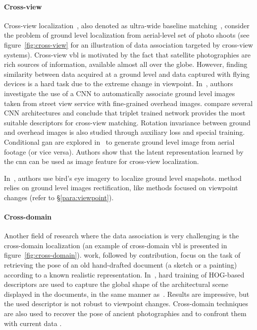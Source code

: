 		\paragraph{Cross-view}
			\label{para:cross_view}
			Cross-view localization~\citep{Lin2013,Workman2015,Castaldo2015,Vo2016,Tian2017}, also denoted as ultra-wide baseline matching~\citep{Bansal2012}, consider the problem of ground level localization from aerial-level set of photo shoots (see figure~\ref{fig:cross-view} for an illustration of data association targeted by cross-view systems). Cross-view \ac{vbl} is motivated by the fact that satellite photographies are rich sources of information, available almost all over the globe. However, finding similarity between data acquired at a ground level and data captured with flying devices is a hard task due to the extreme change in viewpoint. In~\citep{Workman2015,Vo2016}, authors investigate the use of a CNN to automatically associate ground level images taken from street view service with fine-grained overhead images. \citet{Vo2016} compare several CNN architectures and conclude that triplet trained network provides the most suitable descriptors for cross-view matching. Rotation invariance between ground and overhead images is also studied through auxiliary loss and special training. Conditional \ac{gan} are explored in~\citep{Regmi2018} to generate ground level image from aerial footage (or vice versa). Authors show that the latent representation learned by the \ac{cnn} can be used as image feature for cross-view localization.
						
			In~\citep{Bansal2011,Bansal2012,Lin2015}, authors use bird's eye imagery to localize ground level snapshots. \citet{Bansal2011} method relies on ground level images rectification, like methods focused on viewpoint changes (refer to \S\ref{para:viewpoint}).
			
		\paragraph{Cross-domain}
			\label{para:cross_domain}
			Another field of research where the data association is very challenging is the cross-domain localization (an example of cross-domain \ac{vbl} is presented in figure~\ref{fig:cross-domain}). \citet{Russell2011} work, followed by \citet{Aubry2014} contribution, focus on the task of retrieving the pose of an old hand-drafted document (a sketch or a painting) according to a known realistic representation. In~\citep{Aubry2014}, hard training of HOG-based descriptors are used to capture the global shape of the architectural scene displayed in the documents, in the same manner as~\citep{Shrivastava2011}. Results are impressive, but the used descriptor is not robust to viewpoint changes. Cross-domain techniques are also used to recover the pose of ancient photographies and to confront them with current data \citep{Bae2010,Bhowmik2017}.